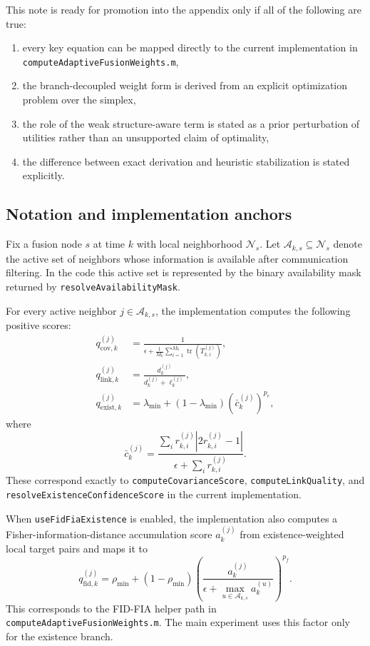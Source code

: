 This note is ready for promotion into the appendix only if all of the following are true:
\begin{enumerate}
\item every key equation can be mapped directly to the current implementation in \texttt{computeAdaptiveFusionWeights.m},
\item the branch-decoupled weight form is derived from an explicit optimization problem over the simplex,
\item the role of the weak structure-aware term is stated as a prior perturbation of utilities rather than an unsupported claim of optimality,
\item the difference between exact derivation and heuristic stabilization is stated explicitly.
\end{enumerate}

\subsection*{Notation and implementation anchors}

Fix a fusion node $s$ at time $k$ with local neighborhood $\mathcal{N}_s$. Let $\mathcal{A}_{k,s} \subseteq \mathcal{N}_s$ denote the active set of neighbors whose information is available after communication filtering. In the code this active set is represented by the binary availability mask returned by \texttt{resolveAvailabilityMask}.

For every active neighbor $j \in \mathcal{A}_{k,s}$, the implementation computes the following positive scores:
\begin{align}
q_{\mathrm{cov},k}^{(j)} &= \frac{1}{\epsilon + \frac{1}{M_k}\sum_{i=1}^{M_k}\operatorname{tr}(T_{k,i}^{(j)})}, \\
q_{\mathrm{link},k}^{(j)} &= \frac{d_k^{(j)}}{d_k^{(j)} + \ell_k^{(j)}}, \\
q_{\mathrm{exist},k}^{(j)} &= \lambda_{\min} + (1-\lambda_{\min}) \left(\bar c_k^{(j)}\right)^{p_e},
\end{align}
where
\begin{equation}
\bar c_k^{(j)} = \frac{\sum_i r_{k,i}^{(j)} |2r_{k,i}^{(j)} - 1|}{\epsilon + \sum_i r_{k,i}^{(j)}}.
\end{equation}
These correspond exactly to \texttt{computeCovarianceScore}, \texttt{computeLinkQuality}, and \texttt{resolveExistenceConfidenceScore} in the current implementation.

When \texttt{useFidFiaExistence} is enabled, the implementation also computes a Fisher-information-distance accumulation score $a_k^{(j)}$ from existence-weighted local target pairs and maps it to
\begin{equation}
q_{\mathrm{fid},k}^{(j)}
=
\rho_{\min}
+(1-\rho_{\min})
\left(
\frac{a_k^{(j)}}{\epsilon+\max_{u\in\mathcal{A}_{k,s}} a_k^{(u)}}
\right)^{p_f}.
\end{equation}
This corresponds to the FID-FIA helper path in \texttt{computeAdaptiveFusionWeights.m}. The main experiment uses this factor only for the existence branch.

